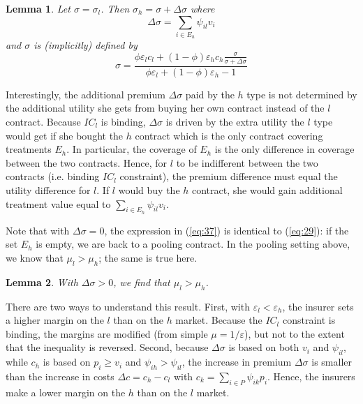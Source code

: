 \documentclass[12pt,english,a4paper]{article}
\newtheorem{lemma}{Lemma}
\begin{document}
\begin{lemma}\label{lem:separating}
Let $\sigma=\sigma_l$. Then $\sigma_h=\sigma+\Delta \sigma$ where
\begin{equation}
\label{eq:52}
\Delta \sigma = \sum_{i \in E_h} \psi_{il} v_i
\end{equation}
and $\sigma$ is (implicitly) defined by
\begin{equation}
\label{eq:37}
\sigma = \frac{\phi \varepsilon_l c_l +(1-\phi) \varepsilon_h c_h \frac{\sigma}{\sigma + \Delta \sigma} }{\phi \varepsilon_l +(1-\phi) \varepsilon_h-1}
\end{equation}
\end{lemma}

Interestingly, the additional premium \(\Delta \sigma\) paid by the \(h\) type is not determined by the additional utility she gets from buying her own contract instead of the \(l\) contract. Because \(IC_l\) is binding, \(\Delta \sigma\) is driven by the extra utility the \(l\) type would get if she bought the \(h\) contract which is the only contract covering treatments \(E_h\). In particular, the coverage of \(E_h\) is the only difference in coverage between the two contracts. Hence, for \(l\) to be indifferent between the two contracts (i.e. binding \(IC_l\) constraint), the premium difference must equal the utility difference for \(l\). If \(l\) would buy the \(h\) contract, she would gain additional treatment value equal to \(\sum_{i \in E_h} \psi_{il} v_i\).

Note that with \(\Delta \sigma =0\), the expression in (\ref{eq:37}) is identical to (\ref{eq:29}): if the set \(E_h\) is empty, we are back to a pooling contract. In the pooling setting above, we know that \(\mu_l>\mu_h\); the same is true here.

\begin{lemma}\label{lem:separatingMulMuh}
With $\Delta \sigma > 0$, we find that $\mu_l > \mu_h$.
\end{lemma}

There are two ways to understand this result. First, with \(\varepsilon_l < \varepsilon_h\), the insurer sets a higher margin on the \(l\) than on the \(h\) market. Because the \(IC_l\) constraint is binding, the margins are modified (from simple \(\mu=1/\varepsilon\)), but not to the extent that the inequality is reversed. Second, because \(\Delta \sigma\) is based on both \(v_i\) and \(\psi_{il}\), while \(c_h\) is based on \(p_i \geq v_i\) and \(\psi_{ih} > \psi_{il}\), the increase in premium \(\Delta \sigma\) is smaller than the increase in costs \(\Delta c = c_h - c_l\) with \(c_k = \sum_{i \in P} \psi_{ik} p_i\). Hence, the insurers make a lower margin on the \(h\) than on the \(l\) market.
\end{document}
